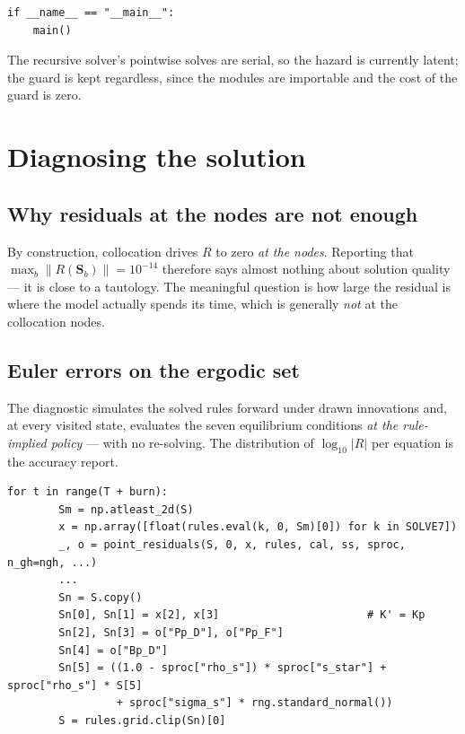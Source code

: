 \documentclass[11pt]{article}
\numberwithin{equation}{section}
\newcommand{\code}[1]{\texttt{\small #1}}
\newcommand{\bS}{\mathbf{S}}
\theoremstyle{definition}
\theoremstyle{plain}
\theoremstyle{remark}
\begin{document}
\begin{lstlisting}
if __name__ == "__main__":
    main()
\end{lstlisting}

The recursive solver's pointwise solves are serial, so the hazard is currently
latent; the guard is kept regardless, since the modules are importable and the cost of
the guard is zero.

\section{Diagnosing the solution}
\label{sec:accuracy}

\subsection{Why residuals at the nodes are not enough}

By construction, collocation drives $R$ to zero \emph{at the nodes}. Reporting that
$\max_b\|R(\bS_b)\|=10^{-14}$ therefore says almost nothing about solution quality ---
it is close to a tautology. The meaningful question is how large the residual is
where the model actually spends its time, which is generally \emph{not} at the
collocation nodes.

\subsection{Euler errors on the ergodic set}

The diagnostic simulates the solved rules forward under drawn innovations and, at
every visited state, evaluates the seven equilibrium conditions \emph{at the
rule-implied policy} --- with no re-solving. The distribution of
$\log_{10}|R|$ per equation is the accuracy report.

\begin{lstlisting}[caption={Simulating the solved rules. \code{accuracy.py}, \code{simulate}.}]
    for t in range(T + burn):
        Sm = np.atleast_2d(S)
        x = np.array([float(rules.eval(k, 0, Sm)[0]) for k in SOLVE7])
        _, o = point_residuals(S, 0, x, rules, cal, ss, sproc, n_gh=ngh, ...)
        ...
        Sn = S.copy()
        Sn[0], Sn[1] = x[2], x[3]                       # K' = Kp
        Sn[2], Sn[3] = o["Pp_D"], o["Pp_F"]
        Sn[4] = o["Bp_D"]
        Sn[5] = ((1.0 - sproc["rho_s"]) * sproc["s_star"] + sproc["rho_s"] * S[5]
                 + sproc["sigma_s"] * rng.standard_normal())
        S = rules.grid.clip(Sn)[0]
\end{lstlisting}
\end{document}
